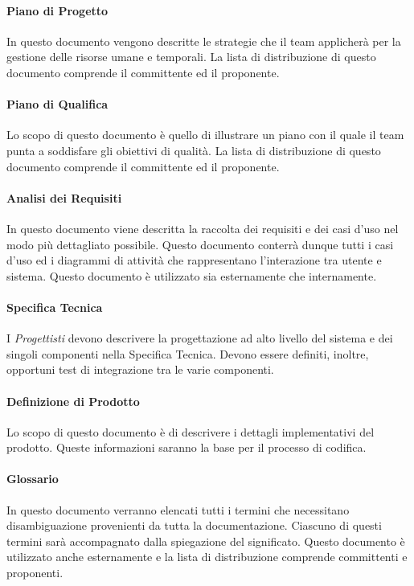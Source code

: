 \paragraph{Piano di Progetto }

In questo documento vengono descritte le strategie che il team
applicherà per la gestione delle risorse umane e temporali. La lista
di distribuzione di questo documento comprende il committente ed il
proponente. 

\paragraph{Piano di Qualifica }

Lo scopo di questo documento è quello di illustrare un piano con il
quale  il team punta a soddisfare gli obiettivi di qualità.  La lista
di distribuzione di questo documento comprende il committente ed il
proponente. 

\paragraph{Analisi dei Requisiti }

In questo documento viene descritta la raccolta dei requisiti e dei
casi d’uso nel modo più dettagliato possibile. Questo documento
conterrà dunque tutti i casi d’uso ed
i diagrammi di attività che rappresentano l’interazione 
tra utente e sistema. Questo documento è utilizzato sia
esternamente che internamente. 


\paragraph{Specifica Tecnica }
I  \emph{Progettisti}  devono descrivere la progettazione ad alto livello del
sistema e dei singoli componenti nella Specifica Tecnica. Devono
essere definiti, inoltre, opportuni test di integrazione tra le varie
componenti.



\paragraph{Definizione di Prodotto  }
Lo scopo di questo documento è di descrivere i dettagli implementativi del prodotto.
Queste informazioni saranno la base per il processo di codifica.

\paragraph{Glossario  }
In questo documento verranno elencati tutti i termini
che necessitano disambiguazione provenienti da tutta la documentazione.
Ciascuno di questi termini sarà accompagnato dalla spiegazione del
significato. Questo documento è utilizzato anche esternamente e la
lista di distribuzione comprende committenti e proponenti. 

